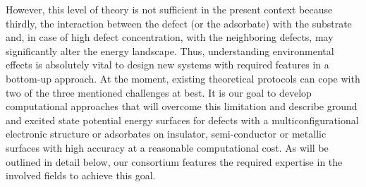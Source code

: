 \documentclass[a4paper,11pt,headings=normal]{scrartcl}
\begin{document}
However, this level of theory is not sufficient in the present context because 
thirdly, the interaction between the defect (or the adsorbate) with the substrate 
and, in case of high defect concentration, with the neighboring defects, may 
significantly alter the energy landscape.\autocite{Kuch2021, Ruben2021}  
Thus, understanding environmental 
effects is absolutely vital to design new systems with required features in a  
bottom-up approach. At the moment, existing theoretical protocols can cope with 
two of the three mentioned challenges at best. It is our goal to develop 
computational approaches that will overcome this limitation and describe ground 
and excited state potential energy surfaces for defects with a 
multiconfigurational electronic structure or 
adsorbates on insulator, semi-conductor or metallic surfaces with high accuracy 
at a reasonable computational cost. As will be outlined in detail below, our 
consortium features the required expertise in the involved fields to achieve 
this goal.\\
\end{document}
